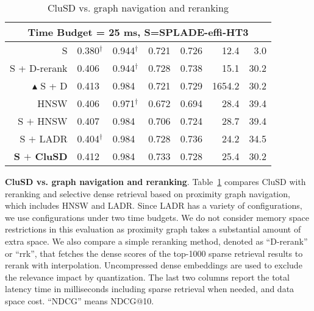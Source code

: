 \begin{table}[htbp]
{\begin{tabular}{r |llll|rr}
       \hline       
            \multicolumn{7}{c}{\bf{Time Budget = 25 ms, S=SPLADE-effi-HT3}}\\
            \hline
            S& 0.380$^\dag$& 0.944$^\dag$& 0.721 &  0.726 & 12.4 & 3.0 \\
             S + D-rerank & 0.406 & 0.944$^\dag$& 0.728 & 0.738 & 15.1 & 30.2 \\
            $\blacktriangle$  S + D & 0.413 & 0.984 & 0.721 &0.729 & 1654.2& 30.2  \\
            \hline
            HNSW & 0.406 & 0.971$^\dag$& 0.672 & 0.694 & 28.4 & 39.4\\
             S $+$ HNSW & 0.407 & 0.984 & 0.706 & 0.724 & 28.7 & 39.4\\
            S $+$ LADR & 0.404$^\dag$& 0.984 & 0.728 &  0.736 & 24.2 & 34.5\\
            \bf S $+$ CluSD & 0.412 & 0.984 & 0.733 & 0.728 & 25.4 & 30.2\\
			\hline\hline
		\end{tabular}  }
	\caption{CluSD vs. graph navigation and reranking 
}
 \vspace*{-8mm}
	\label{tab:maintime}
\end{table}


\textbf{CluSD vs. graph navigation and reranking}. 
\label{sect:evaltimebudget}
Table~\ref{tab:maintime} compares  CluSD with  reranking and selective dense retrieval based on proximity graph navigation, which includes HNSW and LADR.
Since LADR has a variety of configurations, we use configurations under two time budgets.
We do not consider memory space restrictions in this evaluation as proximity graph takes a substantial amount of extra space.
We also compare  a simple reranking method,  denoted as ``D-rerank'' or ``rrk'',
that fetches the dense scores of the top-1000 sparse retrieval results to rerank with interpolation.
Uncompressed dense embeddings  are used to exclude the relevance impact by quantization.
The last two columns report the total latency time in milliseconds including sparse retrieval when needed,
and data space cost. %
``NDCG'' means  NDCG@10.

